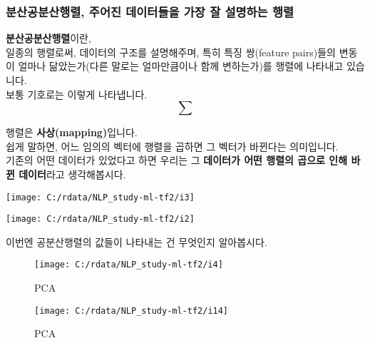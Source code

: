 \documentclass[
]{article}
\begin{document}
\hypertarget{uxbd84uxc0b0uxacf5uxbd84uxc0b0uxd589uxb82c-uxc8fcuxc5b4uxc9c4-uxb370uxc774uxd130uxb4e4uxc744-uxac00uxc7a5-uxc798-uxc124uxba85uxd558uxb294-uxd589uxb82c}{%
\subsubsection{분산공분산행렬, 주어진 데이터들을 가장 잘 설명하는
행렬}\label{uxbd84uxc0b0uxacf5uxbd84uxc0b0uxd589uxb82c-uxc8fcuxc5b4uxc9c4-uxb370uxc774uxd130uxb4e4uxc744-uxac00uxc7a5-uxc798-uxc124uxba85uxd558uxb294-uxd589uxb82c}}

\textbf{분산공분산행렬}이란,\\
일종의 행렬로써, 데이터의 구조를 설명해주며, 특히 특징 쌍(feature
pairs)들의 변동이 얼마나 닮았는가(다른 말로는 얼마만큼이나 함께
변하는가)를 행렬에 나타내고 있습니다.\\
보통 기호로는 이렇게 나타냅니다. \[
\sum
\]

행렬은 \textbf{사상(mapping)}입니다.\\
쉽게 말하면, 어느 임의의 벡터에 행렬을 곱하면 그 벡터가 바뀐다는
의미입니다.\\
기존의 어떤 데이터가 있었다고 하면 우리는 그 \textbf{데이터가 어떤
행렬의 곱으로 인해 바뀐 데이터}라고 생각해봅시다.

\begin{center}\texttt{[image: C:/rdata/NLP\_study-ml-tf2/i3]} \end{center}

\begin{center}\texttt{[image: C:/rdata/NLP\_study-ml-tf2/i2]} \end{center}

이번엔 공분산행렬의 값들이 나타내는 건 무엇인지 알아봅시다.

\begin{figure}

{\centering \texttt{[image: C:/rdata/NLP\_study-ml-tf2/i4]} 

}

\caption{PCA}\label{fig:unnamed-chunk-3}
\end{figure}
\begin{figure}

{\centering \texttt{[image: C:/rdata/NLP\_study-ml-tf2/i14]} 

}

\caption{PCA}\label{fig:unnamed-chunk-4}
\end{figure}
\end{document}
